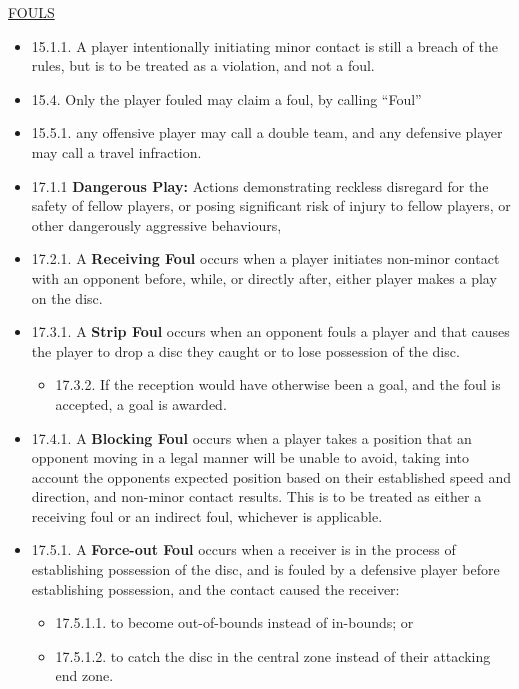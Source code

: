 \begin{center}\underline{\uppercase{fouls}}\end{center}
    \begin{itemize}[noitemsep]
    \tiny

    \item 15.1.1. A player intentionally initiating minor contact is still a breach of the rules, but is to be treated as a violation, and not a foul.
    \item 15.4. Only the player fouled may claim a foul, by calling “Foul”
    \item 15.5.1. any offensive player may call a double team, and any defensive player may call a travel infraction.
    \item 17.1.1 \textbf{Dangerous Play:} Actions demonstrating reckless disregard for the safety of fellow players, or posing significant risk of injury to fellow players, or other dangerously aggressive behaviours,
    \item 17.2.1. A \textbf{Receiving Foul} occurs when a player initiates non-minor contact with an opponent before, while, or directly after, either player makes a play on the disc.
    \item 17.3.1. A \textbf{Strip Foul} occurs when an opponent fouls a player and that causes the player to drop a disc they caught or to lose possession of the disc.
        \begin{itemize}
            \item 17.3.2. If the reception would have otherwise been a goal, and the foul is accepted, a goal is awarded.
        \end{itemize}
    \item 17.4.1. A \textbf{Blocking Foul} occurs when a player takes a position that an opponent moving in a legal manner will be unable to avoid, taking into account the opponents expected position based on their established speed and direction, and non-minor contact results. This is to be treated as either a receiving foul or an indirect foul, whichever is applicable.
    \item 17.5.1. A \textbf{Force-out Foul} occurs when a receiver is in the process of establishing possession of the disc, and is fouled by a defensive player before establishing possession, and the contact caused the receiver:
        \begin{itemize}
            \item 17.5.1.1. to become out-of-bounds instead of in-bounds; or
            \item 17.5.1.2. to catch the disc in the central zone instead of their attacking end zone.

\end{itemize}
\end{itemize}
